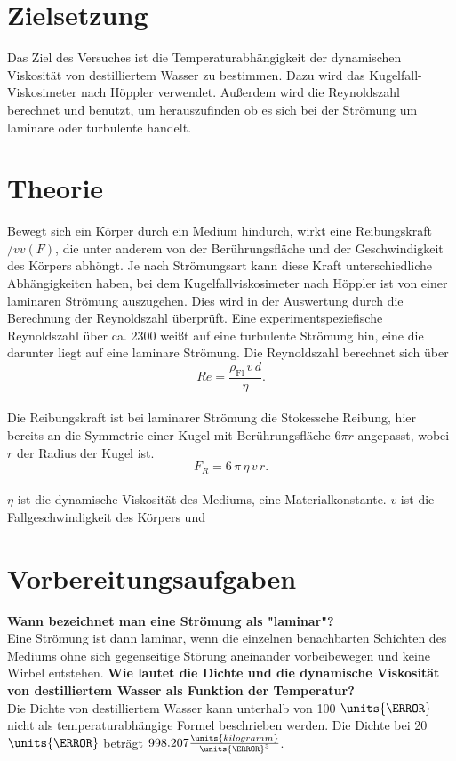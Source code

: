 \section{Zielsetzung}
\label{sec:Zielsetzung}
Das Ziel des Versuches ist die Temperaturabhängigkeit der dynamischen 
Viskosität von destilliertem Wasser zu bestimmen. Dazu wird das Kugelfall-
Viskosimeter nach Höppler verwendet. Außerdem wird die Reynoldszahl 
berechnet und benutzt, um herauszufinden ob es sich bei der Strömung um 
laminare oder turbulente handelt. 
\section{Theorie}
\label{sec:Theorie}
Bewegt sich ein Körper durch ein Medium hindurch, wirkt eine Reibungskraft 
$/vv(F)$, die unter anderem von der Berührungsfläche und der Geschwindigkeit
des Körpers abhöngt. Je nach Strömungsart kann diese Kraft 
unterschiedliche Abhängigkeiten haben, bei dem Kugelfallviskosimeter nach 
Höppler ist von einer laminaren Strömung auszugehen. 
Dies wird in der Auswertung durch die
Berechnung der Reynoldszahl überprüft. Eine experimentspeziefische 
Reynoldszahl über ca. 2300 weißt auf eine turbulente Strömung hin, eine die
darunter liegt auf eine laminare Strömung. Die Reynoldszahl berechnet sich
über $$Re = \frac{\rho_{\text{Fl}}\,v\,d}{\eta}.$$ \\
Die Reibungskraft ist bei laminarer Strömung die Stokessche Reibung, hier 
bereits an die Symmetrie einer Kugel mit Berührungsfläche $6 \pi r$
angepasst, wobei $r$ der Radius der Kugel ist. 
$$F_{R} = 6\,\pi\,\eta\,v\,r.$$ \\
$\eta$ ist die dynamische Viskosität des Mediums, eine Materialkonstante.
$v$ ist die Fallgeschwindigkeit des Körpers und 

\section{Vorbereitungsaufgaben}
\label{sec:Vorbereitungsaufgaben}
\textbf{Wann bezeichnet man eine Strömung als "laminar"?}\\
Eine Strömung ist dann laminar, wenn die einzelnen benachbarten Schichten 
des Mediums ohne sich gegenseitige Störung aneinander vorbeibewegen und 
keine Wirbel entstehen. 
%
\textbf{Wie lautet die Dichte und die dynamische Viskosität von 
destilliertem Wasser als Funktion der Temperatur?}\\
Die Dichte von destilliertem Wasser kann unterhalb von 100 
$\units{\celsius}$ nicht als temperaturabhängige Formel beschrieben werden.
Die Dichte bei 20 $\units{\celsius}$ beträgt $998.207 
\frac{\units{kilogramm}}{\units{\meter}^3}$.
\cite{sample}